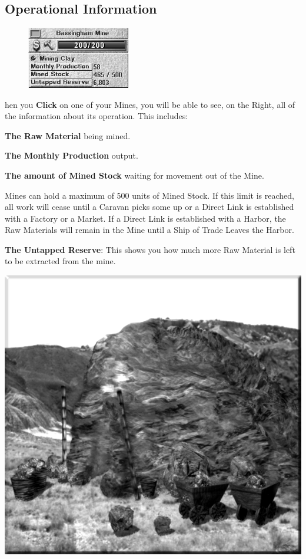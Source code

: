 \subsection{\textsf{Operational Information}}


\begin{figure}
    \vspace{-20pt}
    \begin{center}
        \includegraphics[width=0.4\textwidth]{Imineinfo} %
    \end{center}
    \vspace{-50pt}
\end{figure}

hen you \textbf{Click} on one of your Mines, you will be able to see, on the Right, all of the information about its operation. This includes:

\textbf{The Raw Material} being mined.

\textbf{The Monthly Production} output.

\textbf{The amount of Mined Stock} waiting for movement out of the Mine.

Mines can hold a maximum of 500 units of Mined Stock. If this limit is reached, all work will cease until a Caravan picks some up or a Direct Link is established with a Factory or a Market. If a Direct Link is established with a Harbor, the Raw Materials will remain in the Mine until a Ship of Trade Leaves the Harbor.

\textbf{The Untapped Reserve}: This shows you how much more Raw Material is left to be extracted from the mine.

\begin{center}
    \includegraphics[width=0.6\linewidth]{Amine} %
\end{center}

